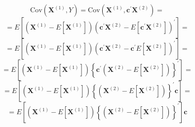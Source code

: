 \begin{enumerate}[font=\bfseries]
\begin{enumerate}
            \[
                \text{Cov}\left(\mathbf{X}^{(1)}, Y\right)
                =
                \text{Cov}\left(\mathbf{X}^{(1)}, \mathbf{c}^\prime
                \mathbf{X}^{(2)}\right)
                =
            \]
            \[
                =
                E\left[\left(\mathbf{X}^{(1)} - E\left[\mathbf{X}^{(1)}\right]\right){\left(\mathbf{c}^\prime\mathbf{X}^{(2)} - E\left[\mathbf{c}^\prime\mathbf{X}^{(2)}\right]\right)}^\prime\right]
                =
            \]
            \[
                =
                E\left[\left(\mathbf{X}^{(1)} - E\left[\mathbf{X}^{(1)}\right]\right){\left(\mathbf{c}^\prime\mathbf{X}^{(2)} - \mathbf{c}^\prime E\left[\mathbf{X}^{(2)}\right]\right)}^\prime\right]
                =
            \]
            \[
                =
                E\left[\left(\mathbf{X}^{(1)} - E\left[\mathbf{X}^{(1)}\right]\right)\left\{\mathbf{c}^\prime\left(\mathbf{X}^{(2)} - E\left[\mathbf{X}^{(2)}\right]\right)\right\}^\prime\right]
                =
            \]
            \[
                =
                E\left[\left(\mathbf{X}^{(1)} - E\left[\mathbf{X}^{(1)}\right]\right)\left\{\left(\mathbf{X}^{(2)} - E\left[\mathbf{X}^{(2)}\right]\right)\right\}^\prime\mathbf{c}\right]
                =
            \]
            \[
                =
                E\left[\left(\mathbf{X}^{(1)} - E\left[\mathbf{X}^{(1)}\right]\right)\left\{\left(\mathbf{X}^{(2)} - E\left[\mathbf{X}^{(2)}\right]\right)\right\}^\prime\right]\mathbf{c}
\]
\end{enumerate}
\end{enumerate}
